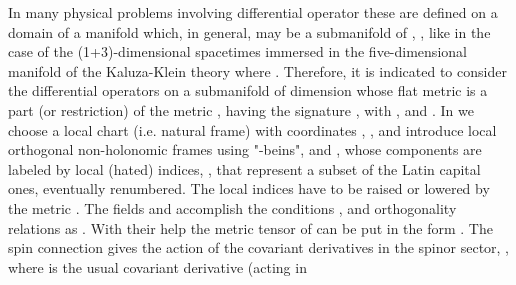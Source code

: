 \documentclass[a4paper,12pt]{article}
\begin{document}
In many physical problems involving  differential operator these are defined 
on a domain of a manifold  which, in general, may be a submanifold of 
\coordHE{}, \coordHE{}, like in the case of the (1+3)-dimensional spacetimes 
immersed in 
the five-dimensional manifold of the Kaluza-Klein theory where \coordHE{}. 
Therefore, it is indicated to consider the differential operators on a 
submanifold \coordHE{}  of dimension \coordHE{} whose flat 
metric \myHighlight{$\eta$}\coordHE{} is a part (or restriction) of the metric \myHighlight{$\tilde\eta$}\coordHE{}, having the
signature \coordHE{}, with \coordHE{},  \coordHE{} and  
\coordHE{}. In \coordHE{} we choose  a local chart (i.e. natural frame) 
with coordinates \coordHE{}, \coordHE{}, and introduce 
local orthogonal non-holonomic frames using "\coordHE{}-beins", \coordHE{} and 
\coordHE{}, whose components are labeled by local (hated) indices, 
\coordHE{}, that represent a subset of the  
Latin capital ones, eventually renumbered. The local indices have to be raised 
or lowered by the metric \myHighlight{$\eta$}\coordHE{}. The fields \coordHE{} and \coordHE{} accomplish the 
conditions   
\coordHE{},
\coordHE{} 
and  orthogonality relations as 
\coordHE{}. With their help   
the metric tensor of \coordHE{} can be put in the form   
\coordHE{}.    
The spin connection 
\coordHE{}
gives the action of the covariant derivatives in the spinor sector,  
\myHighlight{$\nabla_{\mu}\psi=(\tilde\nabla_{\mu}+\Gamma_{\mu})\psi$}\coordHE{}, where 
\myHighlight{$\tilde\nabla_{\mu}=~_{;\mu}$}\coordHE{} is the usual covariant derivative (acting in 
\end{document}
